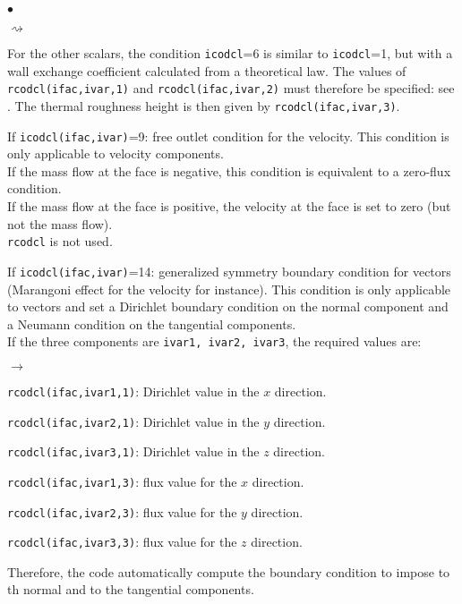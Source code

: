 {{{\begin{list}{$\bullet$}{}
\begin{list}{$\rightsquigarrow$}{}
\item For the other scalars, the condition \texttt{icodcl}=6 is similar to
      \texttt{icodcl}=1, but with a wall exchange coefficient calculated from a
      theoretical law. The values of \texttt{rcodcl(ifac,ivar,1)} and
      \texttt{rcodcl(ifac,ivar,2)} must therefore be specified: see \cite{theory}.
      The thermal roughness height is then given by \texttt{rcodcl(ifac,ivar,3)}.
\end{list}

\item If \texttt{icodcl(ifac,ivar)}=9: free outlet condition for the
      velocity. This condition is only applicable to velocity
      components.\\
      If the mass flow at the face is negative, this condition is equivalent
      to a zero-flux condition.\\
      If the mass flow at the face is positive, the velocity at the face is set to zero (but not the mass flow).\\
\texttt{rcodcl} is not used.

\item If \texttt{icodcl(ifac,ivar)}=14: generalized symmetry boundary condition for vectors (Marangoni       effect for the velocity for instance). 
      This condition is only applicable to vectors and set a Dirichlet boundary condition on the normal
      component and a Neumann condition on the tangential components.\\
      If the three components are  \texttt{ivar1, ivar2, ivar3}, the required values are:

\begin{list}{$\rightarrow$}{}
      \item \texttt{rcodcl(ifac,ivar1,1)}: Dirichlet value in the $x$ direction.
      \item \texttt{rcodcl(ifac,ivar2,1)}: Dirichlet value in the $y$ direction.
      \item \texttt{rcodcl(ifac,ivar3,1)}: Dirichlet value in the $z$ direction.
      \item \texttt{rcodcl(ifac,ivar1,3)}: flux value for the $x$ direction.
      \item \texttt{rcodcl(ifac,ivar2,3)}: flux value for the $y$ direction.
      \item \texttt{rcodcl(ifac,ivar3,3)}: flux value for the $z$ direction.
\end{list}
      Therefore, the code automatically compute the boundary condition to impose to th normal and to
      the tangential components.


\end{list}}}}
